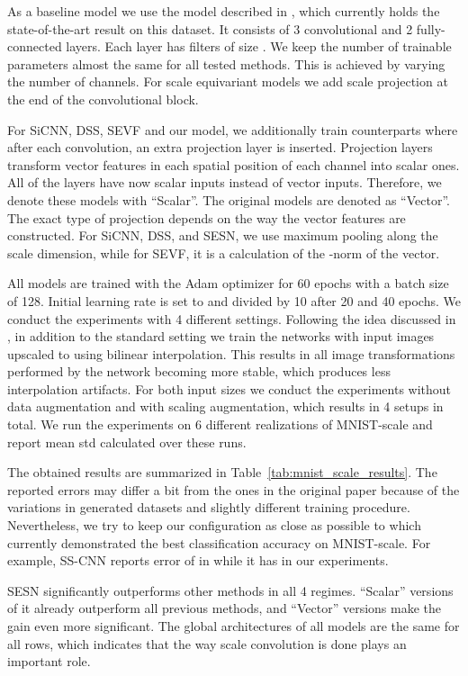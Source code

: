 \documentclass{article} \usepackage{multirow}
\def\Tabref#1{Table~\ref{#1}}
\begin{document}
As a baseline model we use the model described in \citet{ghosh2019scale},
which currently holds the state-of-the-art result on this dataset. It consists of 
3 convolutional and 2 fully-connected layers. 
Each layer has filters of size . 
We keep the number of trainable parameters almost the same for 
all tested methods. This is achieved by varying the number of channels. For scale equivariant models we add
scale projection at the end of the convolutional block. 

For SiCNN, DSS, SEVF and our model, we additionally train counterparts where after 
each convolution, an extra projection layer is inserted.
Projection layers transform vector features in each spatial position of each channel into scalar ones. All of the layers have now scalar inputs instead of vector inputs. Therefore, we denote these models with ``Scalar''. 
The original models are denoted as ``Vector''. The exact type of projection depends on the way the  
vector features are constructed. For SiCNN, DSS, and SESN, we use maximum pooling along 
the scale dimension, 
while for SEVF, it is a calculation of the -norm of the vector. 

All models are trained with the Adam optimizer \citet{kingma2014adam} for 60 epochs with a batch size of 128. 
Initial learning rate is set to  and divided by 10 after 20 and 40 epochs. 
We conduct the experiments with 4 different settings. Following the idea discussed 
in \citet{ghosh2019scale}, in addition to the standard setting we train the networks with 
input images upscaled to  using bilinear interpolation. 
This results in all image transformations performed by the network becoming more stable, 
which produces less interpolation artifacts. For both input sizes we conduct the experiments 
without data augmentation 
and with scaling augmentation, which results in 4 setups in total.
We run the experiments on 6 different realizations of MNIST-scale and 
report mean  std calculated over these runs.

The obtained results are summarized in \Tabref{tab:mnist_scale_results}. 
The reported errors may differ a bit from the ones in the original paper because of the variations 
in generated datasets and slightly different training procedure. Nevertheless, we try to keep 
our configuration as close as possible to \citet{ghosh2019scale} which currently demonstrated the best 
classification accuracy on MNIST-scale. For example, SS-CNN reports 
error of  in \citet{ghosh2019scale} while it has  in our experiments.

SESN significantly outperforms other methods in all 4 regimes. ``Scalar''
versions of it already outperform all previous methods, and ``Vector'' versions make the gain even more significant.
The global architectures of all models are the same for all rows, 
which indicates that the way scale convolution is done plays an
important role. 
\end{document}
